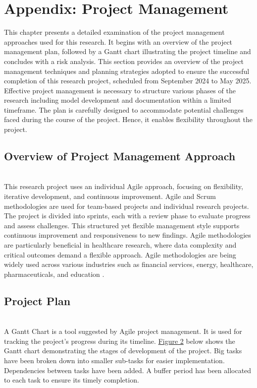 \section{Appendix: Project Management}
\label{app:screen}

This chapter presents a detailed examination of the project management approaches used for this research. It begins with an overview of the project management plan, followed by a Gantt chart illustrating the project timeline and concludes with a risk analysis.
This section provides an overview of the project management techniques and planning strategies adopted to ensure the successful completion of this research project, scheduled from September 2024 to May 2025. \\
Effective project management is necessary to structure various phases of the research including model development and documentation within a limited timeframe. The plan is carefully designed to accommodate potential challenges faced during the course of the project. Hence, it enables flexibility throughout the project. 
\vspace{-3 cm}
\subsection{Overview of Project Management Approach} \leavevmode
\vspace{-0.2 cm}
\\This research project uses an individual Agile approach, focusing on flexibility, iterative development, and continuous improvement. Agile and Scrum methodologies are used for team-based projects and individual research projects. \\The project is divided into sprints, each with a review phase to evaluate progress and assess challenges. This structured yet flexible management style supports continuous improvement and responsiveness to new findings. Agile methodologies are particularly beneficial in healthcare research, where data complexity and critical outcomes demand a flexible approach. Agile methodologies are being widely used across various industries such as financial services, energy, healthcare, pharmaceuticals, and education \cite{zaidi2024review}.
\vspace{-3 cm}
\subsection{Project Plan}\leavevmode
\vspace{-0.2 cm}
\\ A Gantt Chart is a tool suggested by Agile project management. It is used for tracking the project’s progress during its timeline. \hyperref[fig:Gantt Chart]{Figure 2} below shows the Gantt chart demonstrating the stages of development of the project. Big tasks have been broken down into smaller sub-tasks for easier implementation. Dependencies between tasks have been added. A buffer period has been allocated to each task to ensure its timely completion.

